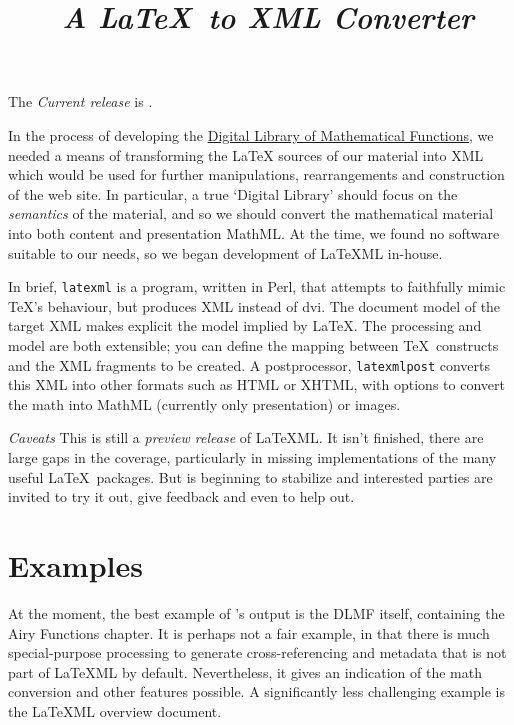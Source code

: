 \documentclass{article}
\title{\LaTeXML\ \emph{A \LaTeX\ to XML Converter}}
\newcommand{\current}{0.5.99}
\begin{document}
\maketitle

The \emph{Current release} is \htmlref{\current}{download}.

In the process of developing the
\href{http://dlmf.nist.gov/}{Digital Library of Mathematical Functions},
we needed a means of transforming
the LaTeX sources of our material into XML which would be used
for further manipulations, rearrangements and construction of the web site.
In particular, a true `Digital Library' should focus on the \emph{semantics}
of the material, and so we should convert the mathematical material into both
content and presentation MathML.
At the time, we found no software suitable to our needs, so we began
development of LaTeXML in-house.  

In brief, \texttt{latexml} is a program, written in Perl, that attempts to
faithfully mimic \TeX's behaviour, but produces XML instead of dvi.
The document model of the target XML makes explicit the model implied
by \LaTeX.
The processing and model are both extensible; you can define
the mapping between \TeX\ constructs and the XML fragments to be created.
A postprocessor, \texttt{latexmlpost} converts this
XML into other formats such as HTML or XHTML, with options
to convert the math into MathML (currently only presentation) or images.

\emph{Caveats} This is still a \emph{preview release} of LaTeXML.
It isn't finished, there are large gaps in the coverage,
particularly in missing implementations of the many useful \LaTeX\ packages.
But is beginning to stabilize and interested parties
are invited to try it out, give feedback and even to help out.


\section{Examples}\label{examples}
At the moment, the best example of \LaTeXML's output is the DLMF itself,
containing the Airy Functions chapter.
It is perhaps not a fair example, in that there is much
special-purpose processing to generate cross-referencing and metadata that is not
part of LaTeXML by default. Nevertheless, it gives an indication of the
math conversion and other features possible.  A significantly less
challenging example is the LaTeXML overview document.
\end{document}
